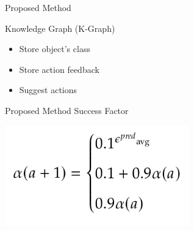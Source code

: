 \begin{frame}[fragile]{Proposed Method} 
\begin{block}{Knowledge Graph (K-Graph)}
    \begin{itemize}
      \item Store object's class
      \item Store action feedback
      \item Suggest actions
    \end{itemize}
  \end{block}
\end{frame}



\begin{frame}[fragile]{Proposed Method} 
  Success Factor \bs

  \includegraphics[width=0.6\textwidth]{figures/proposed_method/successfactor}

\end{frame}


